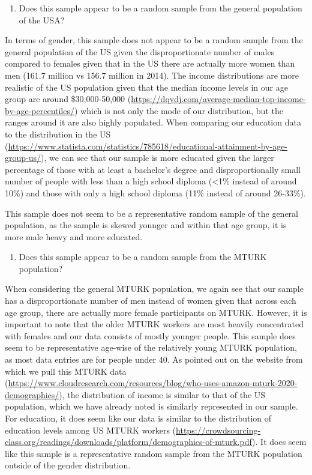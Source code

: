 \documentclass[
]{article}
\providecommand{\tightlist}{%
  \setlength{\itemsep}{0pt}\setlength{\parskip}{0pt}}
\begin{document}
\begin{enumerate}
\def\labelenumi{\roman{enumi}.}
\tightlist
\item
  Does this sample appear to be a random sample from the general
  population of the USA?
\end{enumerate}

In terms of gender, this sample does not appear to be a random sample
from the general population of the US given the disproportionate number
of males compared to females given that in the US there are actually
more women than men (161.7 million vs 156.7 million in 2014). The income
distributions are more realistic of the US population given that the
median income levels in our age group are around \$30,000-50,000
(\url{https://dqydj.com/average-median-top-income-by-age-percentiles/})
which is not only the mode of our distribution, but the ranges around it
are also highly populated. When comparing our education data to the
distribution in the US
(\url{https://www.statista.com/statistics/785618/educational-attainment-by-age-group-us/}),
we can see that our sample is more educated given the larger percentage
of those with at least a bachelor's degree and disproportionally small
number of people with less than a high school diploma (\textless1\%
instead of around 10\%) and those with only a high school diploma (11\%
instead of around 26-33\%).

This sample does not seem to be a representative random sample of the
general population, as the sample is skewed younger and within that age
group, it is more male heavy and more educated.

\begin{enumerate}
\def\labelenumi{\roman{enumi}.}
\setcounter{enumi}{1}
\tightlist
\item
  Does this sample appear to be a random sample from the MTURK
  population?
\end{enumerate}

When considering the general MTURK population, we again see that our
sample has a disproportionate number of men instead of women given that
across each age group, there are actually more female participants on
MTURK. However, it is important to note that the older MTURK workers are
most heavily concentrated with females and our data consists of mostly
younger people. This sample does seem to be representative age-wise of
the relatively young MTURK population, as most data entries are for
people under 40. As pointed out on the website from which we pull this
MTURK data
(\url{https://www.cloudresearch.com/resources/blog/who-uses-amazon-mturk-2020-demographics/}),
the distribution of income is similar to that of the US population,
which we have already noted is similarly represented in our sample. For
education, it does seem like our data is similar to the distribution of
education levels among US MTURK workers
(\url{https://crowdsourcing-class.org/readings/downloads/platform/demographics-of-mturk.pdf}).
It does seem like this sample is a representative random sample from the
MTURK population outside of the gender distribution.
\end{document}
